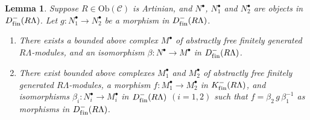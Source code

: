 \documentclass{amsart}
\theoremstyle{plain}
\newtheorem{lemma}[thm]{Lemma}
\theoremstyle{definition}
\theoremstyle{remark}
\begin{document}
\begin{lemma}
\label{lem:corollary3.6}
Suppose $R \in \mathrm{Ob}(\mathcal {C})$ is Artinian, and $N^\bullet$, 
$N_1^\bullet$ and $N_2^\bullet$ are objects in $D^{-}_{\mathrm{f\/in}}(R\Lambda)$. 
Let $g:N_1^\bullet \to 
N_2^\bullet$ be a morphism in $D^{-}_{\mathrm{f\/in}}(R\Lambda)$. 
\begin{enumerate}
\item[(i)]  There exists a bounded above complex $M^\bullet$ of abstractly free finitely generated 
$R\Lambda$-modules, and an isomorphism $\beta:N^\bullet \to M^\bullet$ in 
$D^{-}_{\mathrm{f\/in}}(R\Lambda)$.

\item[(ii)]  There exist bounded above complexes $M_1^\bullet$ and $M_2^\bullet$ of 
abstractly free finitely generated $R\Lambda$-modules, a morphism
$f:M_1^\bullet \to M_2^\bullet$ in $K^-_{\mathrm{f\/in}}(R\Lambda)$, and
isomorphisms $\beta_i:N_i^\bullet \to M_i^\bullet$ in
$D^{-}_{\mathrm{f\/in}}(R\Lambda)$ $(i=1,2)$ such that $f = \beta_{2}\, g \,
\beta_1^{-1}$ as morphisms in $D^{-}_{\mathrm{f\/in}}(R\Lambda)$. 
\end{enumerate}
\end{lemma}
\end{document}

